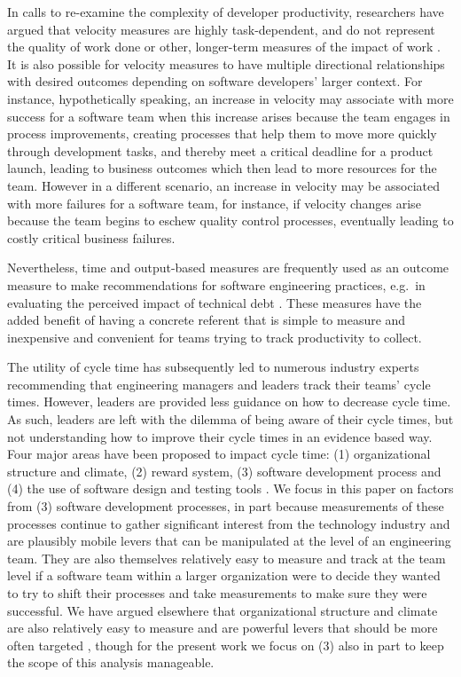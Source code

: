 \documentclass[
  sn-mathphys-ay,
]{sn-jnl}
\begin{document}
In calls to re-examine the complexity of developer productivity,
researchers have argued that velocity measures are highly
task-dependent, and do not represent the quality of work done or other,
longer-term measures of the impact of work
\citep{sadowskiSoftwareDevelopmentProductivity2019}. It is also possible
for velocity measures to have multiple directional relationships with
desired outcomes depending on software developers' larger context. For
instance, hypothetically speaking, an increase in velocity may associate
with more success for a software team when this increase arises because
the team engages in process improvements, creating processes that help
them to move more quickly through development tasks, and thereby meet a
critical deadline for a product launch, leading to business outcomes
which then lead to more resources for the team. However in a different
scenario, an increase in velocity may be associated with more failures
for a software team, for instance, if velocity changes arise because the
team begins to eschew quality control processes, eventually leading to
costly critical business failures.

Nevertheless, time and output-based measures are frequently used as an
outcome measure to make recommendations for software engineering
practices, e.g.~in evaluating the perceived impact of technical debt
\citep{beskerTechnicalDebtCripples2018}. These measures have the added
benefit of having a concrete referent that is simple to measure and
inexpensive and convenient for teams trying to track productivity to
collect.

The utility of cycle time has subsequently led to numerous industry
experts recommending that engineering managers and leaders track their
teams' cycle times. However, leaders are provided less guidance on how
to decrease cycle time. As such, leaders are left with the dilemma of
being aware of their cycle times, but not understanding how to improve
their cycle times in an evidence based way. Four major areas have been
proposed to impact cycle time: (1) organizational structure and climate,
(2) reward system, (3) software development process and (4) the use of
software design and testing tools
\citep{clincySoftwareDevelopmentProductivity2003}. We focus in this
paper on factors from (3) software development processes, in part
because measurements of these processes continue to gather significant
interest from the technology industry and are plausibly mobile levers
that can be manipulated at the level of an engineering team. They are
also themselves relatively easy to measure and track at the team level
if a software team within a larger organization were to decide they
wanted to try to shift their processes and take measurements to make
sure they were successful. We have argued elsewhere that organizational
structure and climate are also relatively easy to measure and are
powerful levers that should be more often targeted
\citep{hicksCumulativeCultureTheory2024, hicksDeveloperThrivingFour2023, hicksDeveloperThrivingFour2024},
though for the present work we focus on (3) also in part to keep the
scope of this analysis manageable.
\end{document}
